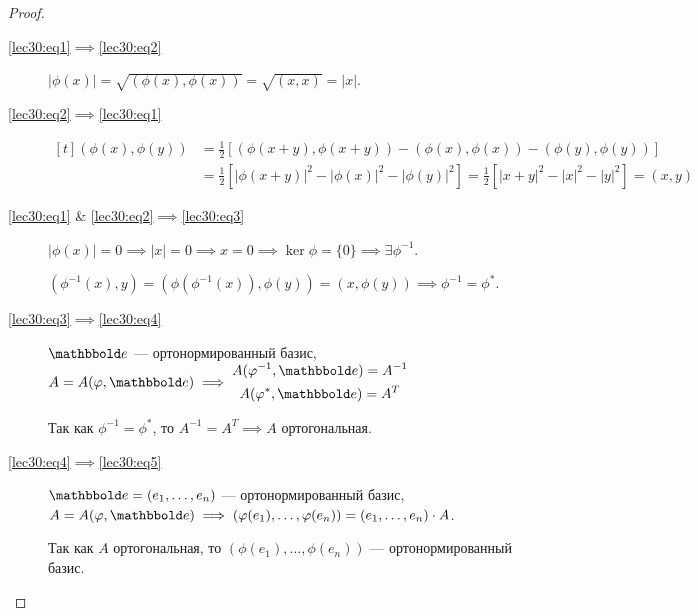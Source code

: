 \begin{proof}~
    \begin{description}
        \item[\ref{lec30:eq1}$\implies$\ref{lec30:eq2}] $\left|\phi(x)\right| = \sqrt{(\phi(x), \phi(x))} = \sqrt{(x, x)} = |x|$.
        \item[\ref{lec30:eq2}$\implies$\ref{lec30:eq1}] 
            \begin{math}
                \begin{aligned}[t]
                    (\phi(x), \phi(y)) &= \frac{1}{2} \left[(\phi(x + y), \phi(x + y)) - (\phi(x), \phi(x)) - (\phi(y), \phi(y))\right] \\
                    &= \frac{1}{2} \left[|\phi(x + y)|^2 - |\phi(x)|^2 - |\phi(y)|^2\right] = \frac{1}{2} \left[|x + y|^2 - |x|^2 - |y|^2\right] = (x, y)
                \end{aligned}
            \end{math}

        \item[\ref{lec30:eq1} \& \ref{lec30:eq2}$\implies$\ref{lec30:eq3}] $|\phi(x)| = 0 \implies |x| = 0 \implies x = 0 \implies \ker \phi = \{0\} \implies \exists \phi^{-1}$.

            $(\phi^{-1}(x), y) = (\phi(\phi^{-1}(x)), \phi(y)) = (x, \phi(y)) \implies \phi^{-1} = \phi^{*}$.

        \item[\ref{lec30:eq3}$\implies$\ref{lec30:eq4}] $\E$ --- ортонормированный базис, 
            \begin{math}
                A = A(\phi, \E) \implies
                \begin{gathered}
                    A(\phi^{-1}, \E) = A^{-1} \\
                    A(\phi^{*}, \E) = A^{T}
                \end{gathered}
            \end{math}

            Так как $\phi^{-1} = \phi^{*}$, то $A^{-1} = A^{T} \implies A$ ортогональная.

        \item[\ref{lec30:eq4}$\implies$\ref{lec30:eq5}] $\E = (e_1, \dots, e_n)$ --- ортонормированный базис, $A = A(\phi, \E) \implies (\phi(e_1), \dots, \phi(e_n)) = (e_1, \dots, e_n) \cdot A$.

            Так как $A$ ортогональная, то $(\phi(e_1), \dots, \phi(e_n))$ --- ортонормированный базис.


\end{description}
\end{proof}
